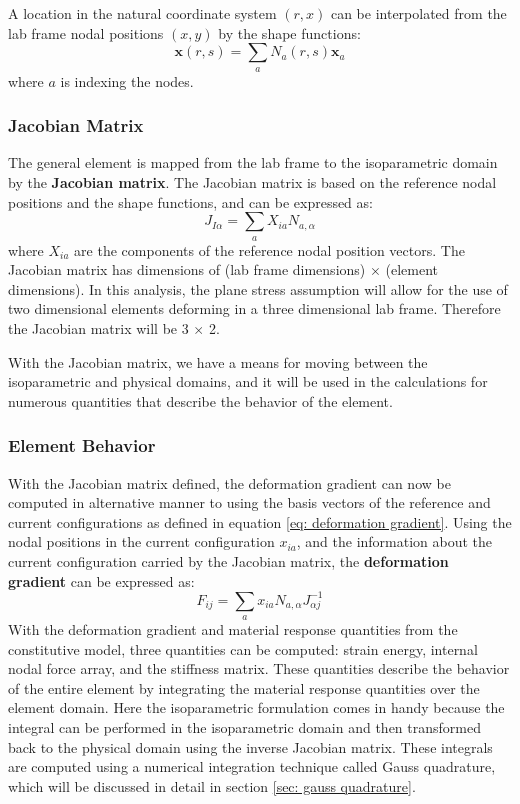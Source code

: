 \documentclass[]{spie}  %
\begin{document}
A location in the natural coordinate system $(r,x)$ can be interpolated from the lab frame nodal positions $(x,y)$ by the shape functions:
\begin{equation}
\label{eq: shape function mapping}
\bm{x}(r,s) = \sum\limits_{a} N_a(r,s) \bm{x}_a
\end{equation}
where $a$ is indexing the nodes. 

\subsubsection{Jacobian Matrix}
The general element is mapped from the lab frame to the isoparametric domain by the \textbf{Jacobian matrix}. The Jacobian matrix is based on the reference nodal positions and the shape functions, and can be expressed as:
\begin{equation}
\label{eq: Jacobian matrix}
J_{I\alpha} = \sum\limits_{a} X_{ia} N_{a,\alpha}
\end{equation}
where $X_{ia}$ are the components of the reference nodal position vectors. The Jacobian matrix has dimensions of (lab frame dimensions) $\times$ (element dimensions). In this analysis, the plane stress assumption will allow for the use of two dimensional elements deforming in a three dimensional lab frame. Therefore the Jacobian matrix will be 3 $\times$ 2. 

With the Jacobian matrix, we have a means for moving between the isoparametric and physical domains, and it will be used in the calculations for numerous quantities that describe the behavior of the element.

\subsubsection{Element Behavior}
With the Jacobian matrix defined, the deformation gradient can now be computed in alternative manner to using the basis vectors of the reference and current configurations as defined in equation \ref{eq: deformation gradient}. Using the nodal positions in the current configuration $x_{ia}$, and the information about the current configuration carried by the Jacobian matrix, the \textbf{deformation gradient} can be expressed as:
\begin{equation}
\label{eq: deformation gradient using Jacobian matrix}
F_{ij} = \sum\limits_{a} x_{ia} N_{a,\alpha} J_{\alpha j}^{-1}
\end{equation}
With the deformation gradient and material response quantities from the constitutive model, three quantities can be computed: strain energy, internal nodal force array, and the stiffness matrix. These quantities describe the behavior of the entire element by integrating the material response quantities over the element domain. Here the isoparametric formulation comes in handy because the integral can be performed in the isoparametric domain and then transformed back to the physical domain using the inverse Jacobian matrix. These integrals are computed using a numerical integration technique called Gauss quadrature, which will be discussed in detail in section \ref{sec: gauss quadrature}. 
\end{document}
